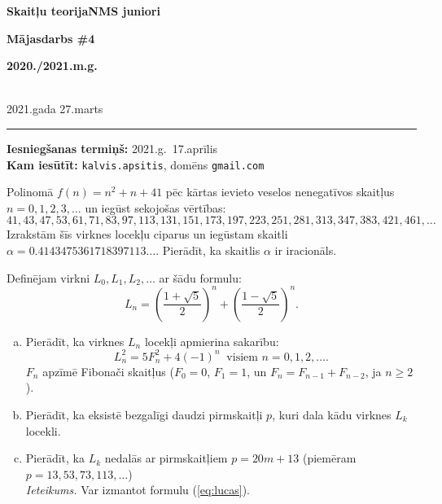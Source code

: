 \documentclass[a4paper,12pt]{article}
\begin{document}
\begin{center}
\parbox{3.5cm}{\flushleft\bf Skaitļu teorija\linebreak NMS juniori} \hfill {\bf\LARGE Mājasdarbs \#4} \hfill \parbox{3.5cm}{\flushright\bf 2020./2021.m.g.} \\[2pt]
\rm\small 2021.gada 27.marts
\end{center}

\hrule

\vspace{10pt}
{\bf Iesniegšanas termiņš:} 2021.g.\ 17.aprīlis\\
{\bf Kam iesūtīt:} {\tt kalvis.apsitis}, domēns {\tt gmail.com}


\vspace{10pt}
\begin{problem}
Polinomā $f(n) = n^2 + n + 41$ pēc kārtas ievieto veselos nenegatīvos skaitļus $n=0,1,2,3,\ldots$ un iegūst sekojošas vērtības:
\[  41, 43, 47, 53, 61, 71, 83, 97, 113, 131, 151, 173, 197, 223, 251, 281, 313, 347, 383, 421, 461, \ldots \]
Izrakstām šīs virknes locekļu ciparus un iegūstam skaitli $\alpha = 0.4143475361718397113\ldots$.
Pierādīt, ka skaitlis $\alpha$ ir iracionāls.
\end{problem}

\vspace{10pt}
\begin{problem}
Definējam virkni $L_0,L_1,L_2,\ldots$ ar šādu formulu: 
\[ L_n = \left( \frac{1 + \sqrt{5}}{2} \right)^n + \left( \frac{1 - \sqrt{5}}{2} \right)^n. \]

\begin{enumerate}[(a)]
\item Pierādīt, ka virknes $L_n$ locekļi apmierina sakarību: 
\begin{equation}
\label{eq:lucas}
L_n^2 = 5F_n^2 + 4(-1)^n\;\;\text{visiem $n = 0,1,2,\ldots$.}
\end{equation}
$F_n$ apzīmē Fibonači skaitļus ($F_0 = 0$, $F_1 = 1$, un $F_n = F_{n-1} + F_{n-2}$, ja $n \geq 2$). 
\item Pierādīt, ka eksistē bezgalīgi daudzi pirmskaitļi $p$, kuri dala kādu virknes $L_k$ locekli.
\item Pierādīt, ka $L_k$ nedalās ar pirmskaitļiem $p = 20m + 13$
(piemēram $p = 13,53,73,113,\ldots$)\\
{\em Ieteikums.} Var izmantot formulu (\ref{eq:lucas}).
\end{enumerate}
\end{problem}
\end{document}
